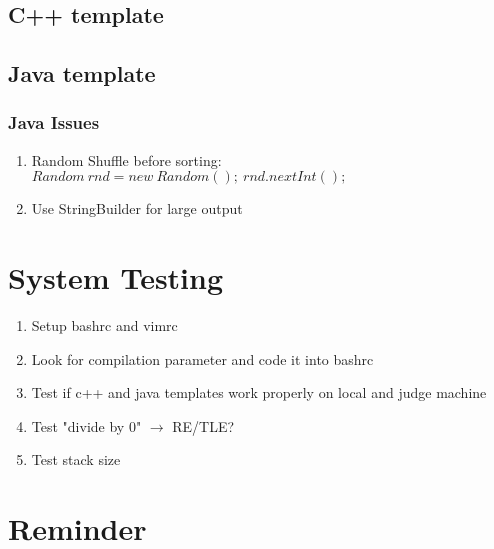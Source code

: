 \documentclass[10pt,oneside]{article}
\begin{document}
\begin{landscape}
\begin{multicols}{2}
\subsection{C++ template}


\subsection{Java template}


\subsubsection{Java Issues}
\begin{enumerate}
	\item Random Shuffle before sorting: $Random\ rnd = new\ Random();\ rnd.nextInt();$
	\item Use StringBuilder for large output
\end{enumerate}

\section{System Testing}

\begin{enumerate}
	\item Setup bashrc and vimrc
	\item Look for compilation parameter and code it into bashrc
	\item Test if c++ and java templates work properly on local and judge machine
	\item Test "divide by 0" $\rightarrow$ RE/TLE?
	\item Test stack size
\end{enumerate}


\section{Reminder}


\end{multicols}
\end{landscape}
\end{document}
